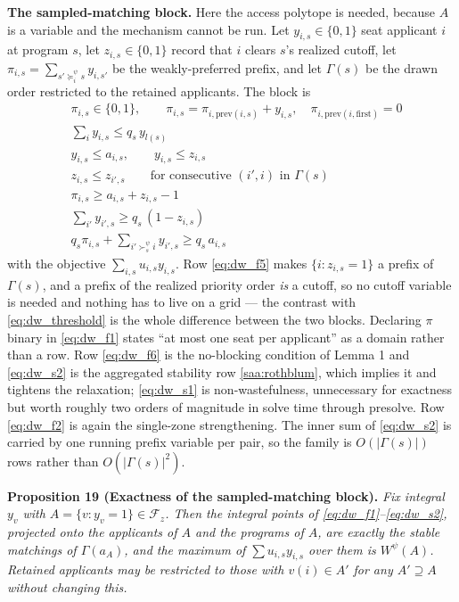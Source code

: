 \documentclass{article}
\begin{document}
\noindent\textbf{The sampled-matching block.} Here the access polytope is
needed, because $A$ is a variable and the mechanism cannot be run. Let
$y_{i,s} \in \{0,1\}$ seat applicant $i$ at program $s$, let
$z_{i,s} \in \{0,1\}$ record that $i$ clears $s$'s realized cutoff, let
$\pi_{i,s} = \sum_{s' \succeq_i^\psi s} y_{i,s'}$ be the weakly-preferred
prefix, and let $\Gamma(s)$ be the drawn order restricted to the retained
applicants. The block is
\begin{align}
& \pi_{i,s} \in \{0,1\}, \qquad
\pi_{i,s} = \pi_{i,\mathrm{prev}(i,s)} + y_{i,s},
\quad \pi_{i,\mathrm{prev}(i, \text{first})} = 0 \label{eq:dw_f1} \\
& \sum_{i} y_{i,s} \leq q_s\, y_{l(s)} \label{eq:dw_f2} \\
& y_{i,s} \leq a_{i,s}, \qquad y_{i,s} \leq z_{i,s} \label{eq:dw_f34} \\
& z_{i,s} \leq z_{i',s} \qquad \text{for consecutive } (i', i) \text{ in } \Gamma(s) \label{eq:dw_f5} \\
& \pi_{i,s} \geq a_{i,s} + z_{i,s} - 1 \label{eq:dw_f6} \\
& \sum_{i'} y_{i',s} \geq q_s\,(1 - z_{i,s}) \label{eq:dw_s1} \\
& q_s \pi_{i,s} + \sum_{i' \succ_s^\psi i} y_{i',s} \geq q_s\, a_{i,s} \label{eq:dw_s2}
\end{align}
with the objective $\sum_{i,s} u_{i,s} y_{i,s}$. Row \eqref{eq:dw_f5} makes
$\{i : z_{i,s} = 1\}$ a prefix of $\Gamma(s)$, and a prefix of the realized
priority order \emph{is} a cutoff, so no cutoff variable is needed and nothing
has to live on a grid --- the contrast with \eqref{eq:dw_threshold} is the whole
difference between the two blocks. Declaring $\pi$ binary in \eqref{eq:dw_f1}
states ``at most one seat per applicant'' as a domain rather than a row.
Row \eqref{eq:dw_f6} is the no-blocking condition of Lemma 1 and
\eqref{eq:dw_s2} is the aggregated stability row \eqref{saa:rothblum}, which
implies it and tightens the relaxation; \eqref{eq:dw_s1} is non-wastefulness,
unnecessary for exactness but worth roughly two orders of magnitude in solve
time through presolve. Row \eqref{eq:dw_f2} is again the single-zone
strengthening. The inner sum of \eqref{eq:dw_s2} is carried by one running
prefix variable per pair, so the family is $O(|\Gamma(s)|)$ rows rather than
$O(|\Gamma(s)|^2)$.

\noindent\textbf{Proposition 19 (Exactness of the sampled-matching block).}
\textit{Fix integral $y_v$ with $A = \{v : y_v = 1\} \in \mathcal F_z$. Then the
integral points of \eqref{eq:dw_f1}--\eqref{eq:dw_s2}, projected onto the
applicants of $A$ and the programs of $A$, are exactly the stable matchings of
$\Gamma(a_A)$, and the maximum of $\sum u_{i,s} y_{i,s}$ over them is
$W^{\psi}(A)$. Retained applicants may be restricted to those with
$v(i) \in A'$ for any $A' \supseteq A$ without changing this.}
\end{document}
